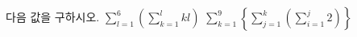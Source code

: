 다음 값을 구하시오.
 $\displaystyle\sum_{l=1}^{6}\left(\sum_{k=1}^{l}kl\right)$
 $\displaystyle\sum_{k=1}^{9}\left\{\sum_{j=1}^{k}\left(\sum_{i=1}^{j}2\right)\right\}$
